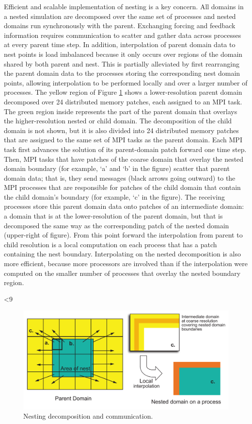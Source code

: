 Efficient and scalable implementation of nesting is a key concern. All
domains in a nested simulation are decomposed over the same set of
processes and nested domains run synchronously with the parent.
Exchanging forcing and feedback information requires communication to
scatter and gather data across processes at every parent time step. In
addition, interpolation of parent domain data to nest points is load
imbalanced because it only occurs over regions of the domain shared by
both parent and nest. This is partially alleviated by first rearranging
the parent domain data to the processes storing the corresponding nest
domain points, allowing interpolation to be performed locally and over
a larger number of processes.  The yellow region of Figure
\ref{figure:5} shows a lower-resolution parent domain decomposed over
24 distributed memory patches, each assigned to an MPI task.  The green
region inside represents the part of the parent domain that overlays
the higher-resolution nested or child domain. The decomposition of the
child domain is not shown, but it is also divided into 24 distributed
memory patches that are assigned to the same set of MPI tasks as the
parent domain. Each MPI task first advances the solution of its
parent-domain patch forward one time step. Then, MPI tasks that have
patches of the coarse domain that overlay the nested domain boundary
(for example, `a' and `b' in the figure) scatter that parent domain
data; that is, they send messages (black arrows going outward) to the
MPI processes that are responsible for patches of the child domain that
contain the child domain's boundary (for example, `c' in the figure).
The receiving processes store this parent domain data onto patches of
an intermediate domain: a domain that is at the lower-resolution of the
parent domain, but that is decomposed the same way as the corresponding
patch of the nested domain (upper-right of figure).
From this point forward the interpolation from parent to child
resolution is a local computation on each process that has a patch
containing the nest boundary.  Interpolating on the nested
decomposition is also more efficient, because more processors are
involved than if the interpolation were computed on the smaller number
of processes that overlay the nested boundary region.

%
%
\ifnum{}<9
\begin{figure}
  \centering
  \includegraphics[width=6.5in]{figures/asf-nesting.pdf}
  \caption{\label{figure:5}Nesting decomposition and communication.}
\end{figure}
\fi

